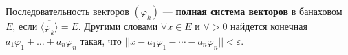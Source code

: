 \begin{to_def}
	Последовательность векторов $(\varphi_k)$ --- \textbf{полная система векторов}  в банаховом $E$, если $\overline{\langle \varphi_k\rangle} = E$. Другими словами $\forall x \in E$ и $\forall >0$ найдется конечная $a_1 \varphi_1 + \ldots + a_n \varphi_n$ такая, что $||x - a_1 \varphi_1 - \cdots - a_n \varphi_n||<\varepsilon$.
\end{to_def}
